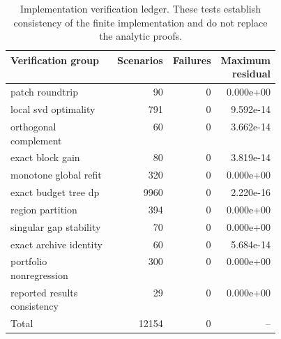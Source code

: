 \begin{table}[tbp]
\centering
\small
\begin{tabular}{L{0.45\linewidth}rrr}
\toprule
Verification group & Scenarios & Failures & Maximum residual\\
\midrule
patch roundtrip & 90 & 0 & 0.000e+00\\
local svd optimality & 791 & 0 & 9.592e-14\\
orthogonal complement & 60 & 0 & 3.662e-14\\
exact block gain & 80 & 0 & 3.819e-14\\
monotone global refit & 320 & 0 & 0.000e+00\\
exact budget tree dp & 9960 & 0 & 2.220e-16\\
region partition & 394 & 0 & 0.000e+00\\
singular gap stability & 70 & 0 & 0.000e+00\\
exact archive identity & 60 & 0 & 5.684e-14\\
portfolio nonregression & 300 & 0 & 0.000e+00\\
reported results consistency & 29 & 0 & 0.000e+00\\
\midrule
Total & 12154 & 0 & --\\
\bottomrule
\end{tabular}
\caption{Implementation verification ledger. These tests establish consistency of the finite implementation and do not replace the analytic proofs.}
\label{tab:final-verification-corrected}
\end{table}
